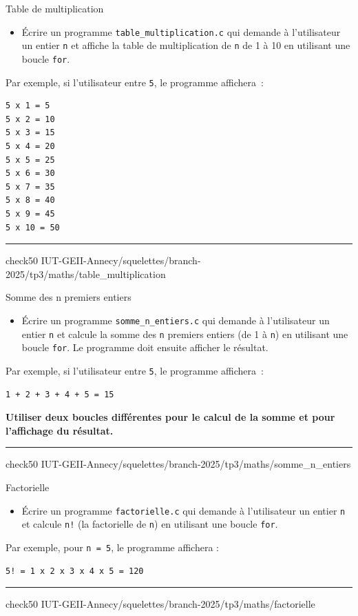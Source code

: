 
\begin{UPSTIManipulation}{Table de multiplication}
	\begin{itemize}
		\item[$\Box$] Écrire un programme \texttt{table_multiplication.c} qui demande à l'utilisateur un entier \texttt{n} et affiche la table de multiplication de \texttt{n} de 1 à 10 en utilisant une boucle \texttt{for}.
	\end{itemize}
	Par exemple, si l'utilisateur entre \texttt{5}, le programme affichera :
	\begin{lstlisting}[language=bash,style=console]
5 x 1 = 5
5 x 2 = 10
5 x 3 = 15
5 x 4 = 20
5 x 5 = 25
5 x 6 = 30
5 x 7 = 35
5 x 8 = 40
5 x 9 = 45
5 x 10 = 50
\end{lstlisting}
	\hrule
	check50 IUT-GEII-Annecy/squelettes/branch-2025/tp3/maths/table_multiplication
\end{UPSTIManipulation}

\begin{UPSTIManipulation}{Somme des n premiers entiers}
	\begin{itemize}
		\item[$\Box$] Écrire un programme \texttt{somme_n_entiers.c} qui demande à l'utilisateur un entier \texttt{n} et calcule la somme des \texttt{n} premiers entiers (de 1 à \texttt{n}) en utilisant une boucle \texttt{for}. Le programme doit ensuite afficher le résultat.
	\end{itemize}
	Par exemple, si l'utilisateur entre \texttt{5}, le programme affichera :
	\begin{lstlisting}[language=bash,style=console]
1 + 2 + 3 + 4 + 5 = 15
\end{lstlisting}
	\textbf{Utiliser deux boucles différentes pour le calcul de la somme et pour l'affichage du résultat.}
	\hrule
	check50 IUT-GEII-Annecy/squelettes/branch-2025/tp3/maths/somme_n_entiers
\end{UPSTIManipulation}

\begin{UPSTIManipulation}{Factorielle}
	\begin{itemize}
		\item[$\Box$] Écrire un programme \texttt{factorielle.c} qui demande à l’utilisateur un entier \texttt{n} et calcule \texttt{n!} (la factorielle de \texttt{n}) en utilisant une boucle \texttt{for}.
	\end{itemize}
	Par exemple, pour \texttt{n = 5}, le programme affichera :
	\begin{lstlisting}[language=bash,style=console]
5! = 1 x 2 x 3 x 4 x 5 = 120
\end{lstlisting}
	\hrule
	check50 IUT-GEII-Annecy/squelettes/branch-2025/tp3/maths/factorielle
\end{UPSTIManipulation}

